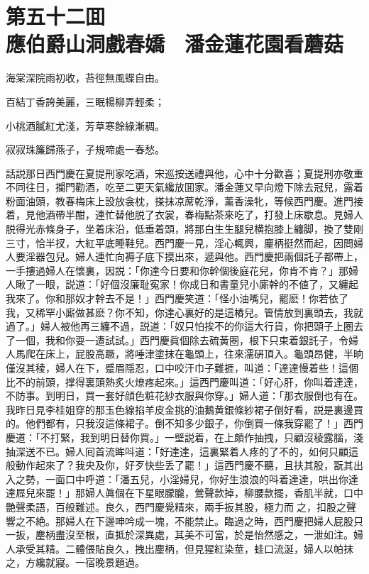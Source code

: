 
\chapter*{第五十二囬　\\應伯爵山洞戲春嬌　潘金蓮花園看蘑菇}


\begin{myquote}
海棠深院雨初收，苔徑無風蝶自由。

百結丁香誇美麗，三眠楊柳弄輕柔；

小桃酒膩紅尤淺，芳草寒餘綠漸稠。

寂寂珠簾歸燕子，子規啼處一春愁。
\end{myquote}

話説那日西門慶在夏提刑家吃酒，宋巡按送禮與他，心中十分歡喜；夏提刑亦敬重不同往日，攔門勸酒，吃至二更天氣纔放囬家。潘金蓮又早向燈下除去冠兒，露着粉面油頭，教春梅床上設放衾枕，搽抹凉蓆乾淨，薰香澡牝，等候西門慶。進門接着，見他酒帶半酣，連忙替他脱了衣裳，春梅點茶來吃了，打發上床歇息。見婦人脱得光赤條身子，坐着床沿，低垂着頭，將那白生生腿兒横抱膝上纏脚，換了雙剛三寸，恰半扠，大紅平底睡鞋兒。西門慶一見，淫心輒興，麈柄挺然而起，因問婦人要淫器包兒。婦人連忙向褥子底下摸出來，遞與他。西門慶把兩個託子都帶上，一手摟過婦人在懷裏，因説：「你達今日要和你幹個後庭花兒，你肯不肯？」那婦人瞅了一眼，説道：「好個沒廉耻寃家！你成日和書童兒小廝幹的不値了，又纏起我來了。你和那奴才幹去不是！」西門慶笑道：「怪小油嘴兒，罷麽！你若依了我，又稀罕小廝做甚麽？你不知，你達心裏好的是這樁兒。管情放到裏頭去，我就過了。」婦人被他再三纏不過，説道：「奴只怕挨不的你這大行貨，你把頭子上圈去了一個，我和你耍一遭試試。」西門慶眞個除去硫黃圈，根下只束着銀託子，令婦人馬爬在床上，屁股高蹶，將唾津塗抹在龜頭上，往來濡硏頂入。龜頭昂健，半晌僅沒其稜，婦人在下，蹙眉隱忍，口中咬汗巾子難捱，叫道：「達達慢着些！這個比不的前頭，撑得裏頭熱炙火燎疼起來。」這西門慶叫道：「好心肝，你叫着達達，不防事。到明日，買一套好顔色粧花紗衣服與你穿。」婦人道：「那衣服倒也有在。我昨日見李桂姐穿的那玉色線掐羊皮金挑的油鵝黄銀條紗裙子倒好看，説是裏邊買的。他們都有，只我沒這條裙子。倒不知多少銀子，你倒買一條我穿罷了！」西門慶道：「不打緊，我到明日替你買。」一壁説着，在上頗作抽拽，只顧沒稜露腦，淺抽深送不已。婦人囘首流眸呌道：「好達達，這裏緊着人疼的了不的，如何只顧這般動作起來了？我央及你，好歹快些丢了罷！」這西門慶不聽，且扶其股，翫其出入之勢，一面口中呼道：「潘五兒，小淫婦兒，你好生浪浪的呌着達達，哄出你達達㞞兒來罷！」那婦人眞個在下星眼朦朧，鶯聲款掉，柳腰款擺，香肌半就，口中艷聲柔語，百般難述。良久，西門慶覺精來，兩手扳其股，極力而𢵞之，扣股之聲響之不絶。那婦人在下邊呻吟成一塊，不能禁止。臨過之時，西門慶把婦人屁股只一扳，麈柄盡沒至根，直抵於深異處，其美不可當，於是怡然感之，一泄如注。婦人承受其精。二體偎貼良久，拽出麈柄，但見猩紅染莖，蛙口流涎，婦人以帕抹之，方纔就寢。一宿晚景題過。


